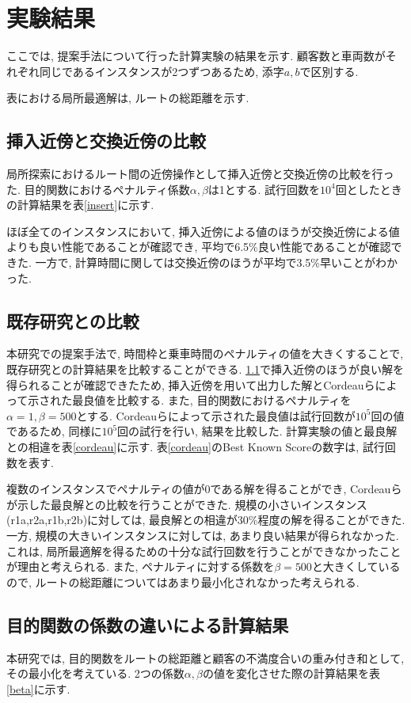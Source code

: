 \section{実験結果}
ここでは, 提案手法について行った計算実験の結果を示す.
顧客数と車両数がそれぞれ同じであるインスタンスが2つずつあるため, 添字$a,b$で区別する.

表における局所最適解は, ルートの総距離を示す.
\subsection{挿入近傍と交換近傍の比較}
\label{sec:insert}
局所探索におけるルート間の近傍操作として挿入近傍と交換近傍の比較を行った.
目的関数におけるペナルティ係数$\alpha,\beta$は1とする.
試行回数を$10^4$回としたときの計算結果を表\ref{insert}に示す.

ほぼ全てのインスタンスにおいて, 挿入近傍による値のほうが交換近傍による値よりも良い性能であることが確認でき, 平均で6.5\%良い性能であることが確認できた. 一方で, 計算時間に関しては交換近傍のほうが平均で3.5\%早いことがわかった.
\subsection{既存研究との比較}
\label{sec:cordeau}
本研究での提案手法で, 時間枠と乗車時間のペナルティの値を大きくすることで, 既存研究との計算結果を比較することができる. \ref{sec:insert}で挿入近傍のほうが良い解を得られることが確認できたため, 挿入近傍を用いて出力した解とCordeauらによって示された最良値を比較する. また, 目的関数におけるペナルティを$\alpha=1,\beta=500$とする.
Cordeauらによって示された最良値は試行回数が$10^5$回の値であるため, 同様に$10^5$回の試行を行い, 結果を比較した. 計算実験の値と最良解との相違を表\ref{cordeau}に示す. 表\ref{cordeau}のBest Known Scoreの数字は, 試行回数を表す.

複数のインスタンスでペナルティの値が0である解を得ることができ, Cordeauらが示した最良解との比較を行うことができた.
規模の小さいインスタンス(r1a,r2a,r1b,r2b)に対しては, 最良解との相違が30\%程度の解を得ることができた. 一方, 規模の大きいインスタンスに対しては, あまり良い結果が得られなかった. これは, 局所最適解を得るための十分な試行回数を行うことができなかったことが理由と考えられる. また, ペナルティに対する係数を$\beta=500$と大きくしているので, ルートの総距離についてはあまり最小化されなかった考えられる.
\subsection{目的関数の係数の違いによる計算結果}
本研究では, 目的関数をルートの総距離と顧客の不満度合いの重み付き和として, その最小化を考えている. 2つの係数$\alpha,\beta$の値を変化させた際の計算結果を表\ref{beta}に示す.

